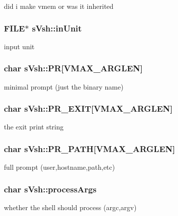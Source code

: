 did i make vmem or was it inherited 

\subsubsection[{inUnit}]{\setlength{\rightskip}{0pt plus 5cm}FILE$\ast$ {\bf sVsh::inUnit}}\label{a00007_a71b219a119b8ea2d6a8e8310fff87ad5}


input unit 

\subsubsection[{PR}]{\setlength{\rightskip}{0pt plus 5cm}char {\bf sVsh::PR}[VMAX\_\-ARGLEN]}\label{a00007_ad8d9d3a62f8a4a3cb4378aa58df6c976}


minimal prompt (just the binary name) 

\subsubsection[{PR\_\-EXIT}]{\setlength{\rightskip}{0pt plus 5cm}char {\bf sVsh::PR\_\-EXIT}[VMAX\_\-ARGLEN]}\label{a00007_a5973c822b71c353f131271631bbb43d0}


the exit print string 

\subsubsection[{PR\_\-PATH}]{\setlength{\rightskip}{0pt plus 5cm}char {\bf sVsh::PR\_\-PATH}[VMAX\_\-ARGLEN]}\label{a00007_a3d143e1a14f7ccd95292039d17679c17}


full prompt (user,hostname,path,etc) 

\subsubsection[{processArgs}]{\setlength{\rightskip}{0pt plus 5cm}char {\bf sVsh::processArgs}}\label{a00007_a4787c933c7915d6c1f8500e8d97abe7c}


whether the shell should process (argc,argv) 

